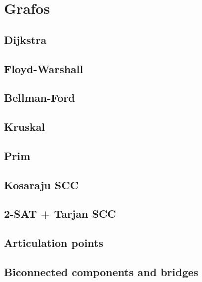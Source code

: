 \newpage
\section{Grafos}

\subsection{Dijkstra}

\subsection{Floyd-Warshall}

\newpage
\subsection{Bellman-Ford}


\newpage
\subsection{Kruskal}

\subsection{Prim}


\subsection{Kosaraju SCC}

\subsection{2-SAT + Tarjan SCC}


\subsection{Articulation points}

\subsection{Biconnected components and bridges}


